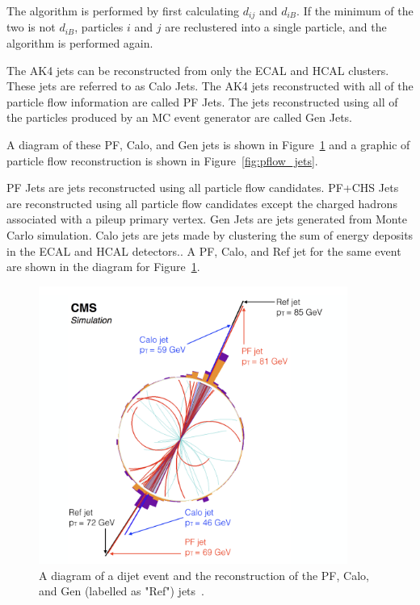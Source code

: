 The algorithm is performed by first calculating $d_{ij}$ and $d_{iB}$. If the minimum of the two is not $d_{iB}$, particles $i$ and $j$ are reclustered into a single particle, and the algorithm is performed again.

The AK4 jets can be reconstructed from only the ECAL and HCAL clusters. These jets are referred to as Calo Jets. The AK4 jets reconstructed with all of the particle flow information are called PF Jets. The jets reconstructed using all of the particles produced by an MC event generator are called Gen Jets. 


A diagram of these PF, Calo, and Gen jets is shown in Figure~\ref{fig:pfjet} and a graphic of particle flow reconstruction is shown in Figure~\ref{fig:pflow_jets}.


PF Jets are jets reconstructed using all particle flow candidates. PF+CHS Jets are reconstructed using all particle flow candidates except the charged hadrons associated with a pileup primary vertex. Gen Jets are jets generated from Monte Carlo simulation. Calo jets are jets made by clustering the sum of energy deposits in the ECAL and HCAL detectors.. A PF, Calo, and Ref jet for the same event are shown in the diagram for Figure~\ref{fig:pfjet}.

\begin{figure}[h]
\centering
\includegraphics[width=0.9\textwidth]{figures/pf_jet_diagram}
\caption{A diagram of a dijet event and the reconstruction of the PF, Calo, and Gen (labelled as "Ref") jets~\cite{pflow}.}
\label{fig:pfjet}
\end{figure}



